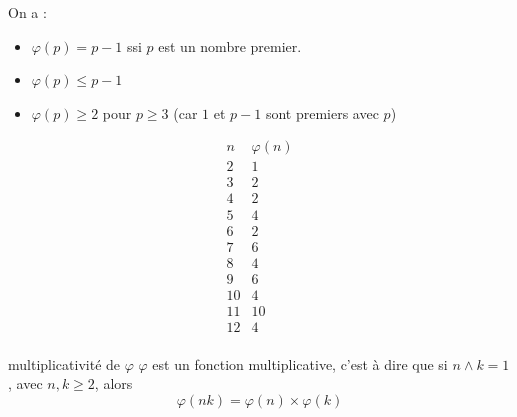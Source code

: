 \begin{remarque}
    On a : 
    \begin{itemize}
        \item $\varphi(p) = p - 1$ ssi $p$ est un nombre premier.
        \item $\varphi(p) \leqslant p - 1$
        \item $\varphi(p) \geqslant 2$ pour $p \geqslant 3$ (car $1$ et $p - 1$ sont premiers avec $p$)
    \end{itemize}
\end{remarque}

\[
    \begin{array}{c|c}
        n & \varphi(n) \\
        \hline
        2 & 1 \\
        3 & 2 \\
        4 & 2 \\
        5 & 4 \\
        6 & 2 \\
        7 & 6 \\
        8 & 4 \\
        9 & 6 \\
        10 & 4 \\
        11 & 10 \\
        12 & 4 \\
    \end{array}
\]

\begin{theoreme}{multiplicativité de $\varphi$}{}
    $\varphi$ est un fonction multiplicative, c'est à dire que 
    si $n \wedge k = 1$, avec $n, k \geqslant 2$, alors
    $$\varphi(nk) = \varphi(n) \times \varphi(k)$$
\end{theoreme}

